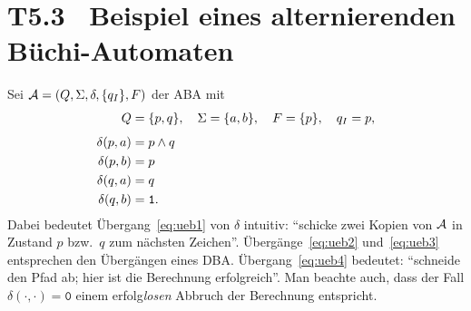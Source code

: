 \documentclass[fontsize=11pt, twoside=false, numbers=autoenddot]{scrbook}
\begin{document}
\section*{T5.3~ Beispiel eines alternierenden Büchi-Automaten}

Sei $\mathcal{A} = (Q,\Sigma,\delta,\{q_I\},F)$ der ABA mit
%
\begin{align}
  Q & = \{p,q\},\quad \Sigma = \{a,b\},\quad F = \{p\},\quad q_I = p, \notag \\[4pt]
  \delta(p,a) & = p \land q   \label{eq:ueb1}\\
  \delta(p,b) & = p           \label{eq:ueb2}\\
  \delta(q,a) & = q           \label{eq:ueb3}\\
  \delta(q,b) & = \texttt{1}. \label{eq:ueb4}
\end{align}
%
Dabei bedeutet Übergang~\eqref{eq:ueb1} von $\delta$ intuitiv:
"`schicke zwei Kopien von $\mathcal{A}$ in Zustand $p$ bzw.\ $q$ zum nächsten Zeichen"'.
Übergänge~\eqref{eq:ueb2} und~\eqref{eq:ueb3} entsprechen den Übergängen eines DBA.
Übergang~\eqref{eq:ueb4} bedeutet: "`schneide den Pfad ab; hier ist die Berechnung erfolgreich"'.
Man beachte auch, dass der Fall $\delta(\cdot,\cdot)=\texttt{0}$
einem erfolg\emph{losen} Abbruch der Berechnung entspricht.
\end{document}
